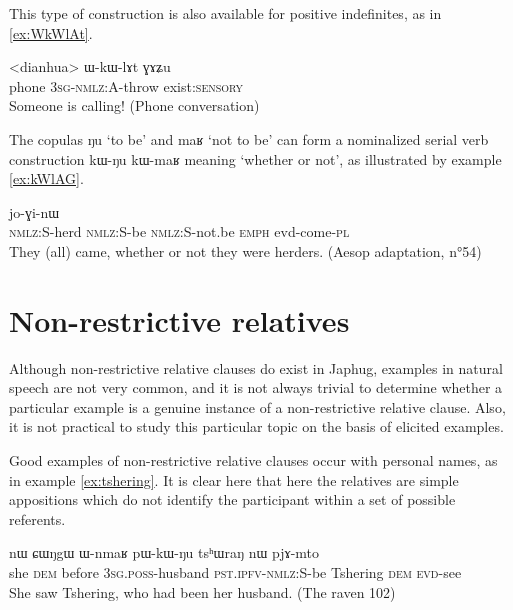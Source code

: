 \documentclass[oldfontcommands,oneside,a4paper,11pt]{article}
\newcommand{\ipa}[1]{{\phon #1}} %
\newcommand{\topic}{\textsc{dem}}
\begin{document}
This type of construction is also available for positive indefinites, as in \ref{ex:WkWlAt}.
\begin{exe}
   \ex  \label{ex:WkWlAt}
\gll   
<dianhua>  	\ipa{ɯ-kɯ-lɤt}  	\ipa{ɣɤʑu}  \e \textsc{3sg-nmlz}:A-throw exist:\textsc{sensory}  \\
\glt Someone is calling! (Phone conversation)
\end{exe}


The   copulas \ipa{ŋu} `to be' and \ipa{maʁ} `not to be' can form a nominalized serial verb construction \ipa{kɯ-ŋu} \ipa{kɯ-maʁ} meaning `whether or not', as illustrated by example \ref{ex:kWlAG}.


\begin{exe}
   \ex  \label{ex:kWlAG}
\gll 
[\ipa{kɯ-lɤɣ}  	\ipa{kɯ-ŋu}  	\ipa{kɯ-maʁ}]  	\ipa{ʑo}  	\ipa{jo-ɣi-nɯ}  \\
\textsc{nmlz:S}-herd \textsc{nmlz:S}-be \textsc{nmlz:S}-not.be \textsc{emph} evd-come-\textsc{pl} \\
\glt They (all) came, whether or not they were herders.
(Aesop adaptation, n°54)
\end{exe}

\section{Non-restrictive relatives}  \label{sec:non.restrictive}
Although non-restrictive relative clauses do exist in Japhug, examples in natural speech are not very common, and it is not always trivial to determine whether a particular example is a genuine instance of a non-restrictive relative clause. Also, it is not practical to study this particular topic on the basis of elicited examples.

Good examples of non-restrictive relative clauses occur with personal names,  as in example \ref{ex:tshering}. It is clear here that here the relatives are simple appositions which do not identify the participant within a set of possible referents.



\begin{exe}
   \ex \label{ex:tshering}
\gll  \ipa{ɯʑo}  	\ipa{nɯ} \ipa{ɕɯŋgɯ}  	\ipa{ɯ-nmaʁ}  	\ipa{pɯ-kɯ-ŋu}  	\ipa{tsʰɯraŋ}  	\ipa{nɯ}  	\ipa{pjɤ-mto}  	\\
she \textsc{dem} before \textsc{3sg.poss}-husband \textsc{pst.ipfv-nmlz:S}-be Tshering \topic{} \textsc{evd}-see \\
 \glt   She saw Tshering, who had been her husband. (The raven 102)
   \end{exe} 
\end{document}
